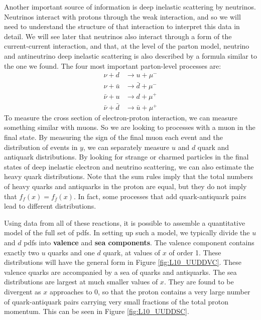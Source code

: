 \documentclass[../../main/main.tex]{subfiles}
\begin{document}
Another important source of information is deep inelastic scattering by neutrinos. Neutrinos interact with protons through the weak interaction, and so we will need to understand the structure of that interaction to interpret this data in detail. We will see later that neutrinos also interact through a form of the current-current interaction, and that, at the level of the parton model, neutrino and antineutrino deep inelastic scattering is also described by a formula similar to the one we found. The four most important parton-level processes are:
\begin{align}
	\nu + d 			&\longrightarrow u 		 + \mu^-	\\
	\nu + \bar{u}		&\longrightarrow \bar{d} + \mu^-	\\
	\bar{\nu} + u		&\longrightarrow d  	 + \mu^+	\\
	\bar{\nu} + \bar{d} &\longrightarrow \bar{u} + \mu^+
\end{align}
To measure the cross section of electron-proton interaction, we can measure something similar with muons. So we are looking to processes with a muon in the final state. By measuring the sign of
the final muon each event and the distribution of events in \( y \), we can separately measure \( u \) and \( d \) quark and antiquark distributions. By looking for strange or charmed particles in the final states of deep inelastic electron and neutrino scattering, we can also estimate the heavy quark distributions. Note that the sum rules imply that the total numbers of heavy quarks and antiquarks in the proton are equal, but they do not imply that \( f_f(x) = f_{\bar{f}}(x) \). In fact, some processes that add quark-antiquark pairs lead to different distributions.

Using data from all of these reactions, it is possible to assemble a quantitative model of the full set of pdfs. In setting up such a model, we typically divide the \( u \) and \( d \) pdfs into \textbf{valence} and \textbf{sea components}. The valence component contains exactly two \( u \) quarks and one \( d \) quark, at values of \( x \) of order 1. These distributions will have the general form in Figure \ref{fig:L10_UUDDVC}. These valence quarks are accompanied by a sea of quarks and antiquarks. The sea distributions are largest at much smaller values of \( x \). They are found to be divergent as \( x \) approaches to 0, so that the proton contains a very large number of quark-antiquark pairs carrying very small fractions of the total proton momentum. This can be seen in Figure \ref{fig:L10_UUDDSC}.
\end{document}
